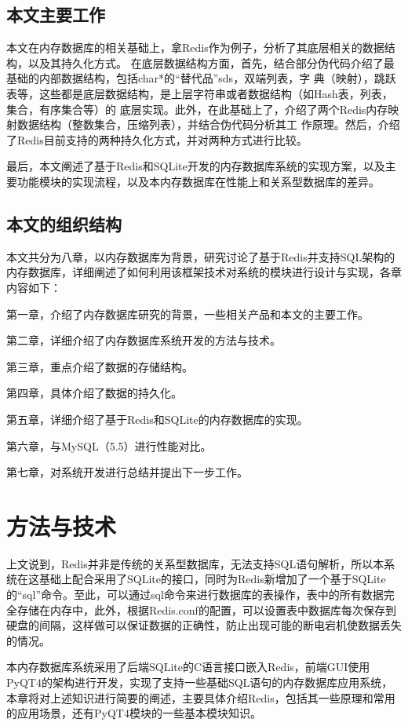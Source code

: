\documentclass{zjutthesis}
\begin{document}
\section{本文主要工作}
本文在内存数据库的相关基础上，拿Redis作为例子，分析了其底层相关的数据结构，以及其持久化方式。
在底层数据结构方面，首先，结合部分伪代码介绍了最基础的内部数据结构，包括char*的“替代品”sds，双端列表，字
典（映射），跳跃表等，这些都是底层数据结构，是上层字符串或者数据结构（如Hash表，列表，集合，有序集合等）的
底层实现。此外，在此基础上了，介绍了两个Redis内存映射数据结构（整数集合，压缩列表），并结合伪代码分析其工
作原理。然后，介绍了Redis目前支持的两种持久化方式，并对两种方式进行比较。

最后，本文阐述了基于Redis和SQLite开发的内存数据库系统的实现方案，以及主要功能模块的实现流程，以及本内存数据库在性能上和关系型数据库的差异。

\section{本文的组织结构}
本文共分为八章，以内存数据库为背景，研究讨论了基于Redis并支持SQL架构的内存数据库，详细阐述了如何利用该框架技术对系统的模块进行设计与实现，各章内容如下：

第一章，介绍了内存数据库研究的背景，一些相关产品和本文的主要工作。

第二章，详细介绍了内存数据库系统开发的方法与技术。

第三章，重点介绍了数据的存储结构。

第四章，具体介绍了数据的持久化。

第五章，详细介绍了基于Redis和SQLite的内存数据库的实现。

第六章，与MySQL（5.5）进行性能对比。

第七章，对系统开发进行总结并提出下一步工作。


\chapter{方法与技术}
上文说到，Redis并非是传统的关系型数据库，无法支持SQL语句解析，所以本系统在这基础上配合采用了SQLite的接口，同时为Redis新增加了一个基于SQLite的“sql”命令。至此，可以通过sql命令来进行数据库的表操作，表中的所有数据完全存储在内存中，此外，根据Redis.conf的配置，可以设置表中数据库每次保存到硬盘的间隔，这样做可以保证数据的正确性，防止出现可能的断电宕机使数据丢失的情况。

本内存数据库系统采用了后端SQLite的C语言接口嵌入Redis，前端GUI使用PyQT4的架构进行开发，实现了支持一些基础SQL语句的内存数据库应用系统，本章将对上述知识进行简要的阐述，主要具体介绍Redis，包括其一些原理和常用的应用场景，还有PyQT4模块的一些基本模块知识。
\end{document}
